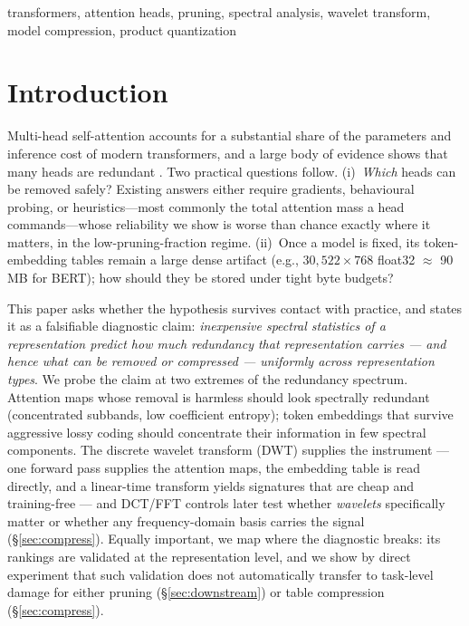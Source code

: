 \documentclass[conference]{IEEEtran}
\begin{document}
\begin{IEEEkeywords}
transformers, attention heads, pruning, spectral analysis, wavelet
transform, model compression, product quantization
\end{IEEEkeywords}

\section{Introduction}
Multi-head self-attention \cite{vaswani2017} accounts for a substantial
share of the parameters and inference cost of modern transformers, and a
large body of evidence shows that many heads are redundant
\cite{michel2019,voita2019,dalvi2020}. Two practical questions follow.
(i)~\emph{Which} heads can be removed safely? Existing answers either
require gradients, behavioural probing, or heuristics---most commonly
the total attention mass a head commands---whose reliability we show is
worse than chance exactly where it matters, in the low-pruning-fraction
regime. (ii)~Once a model is fixed, its token-embedding tables remain a
large dense artifact (e.g., $30{,}522\times768$ float32 $\approx$
90\,MB for BERT); how should they be stored under tight byte budgets?

This paper asks whether the hypothesis survives contact with practice,
and states it as a falsifiable diagnostic claim: \emph{inexpensive
spectral statistics of a representation predict how much redundancy that
representation carries --- and hence what can be removed or compressed
--- uniformly across representation types}. We probe the claim at two
extremes of the redundancy spectrum. Attention maps whose removal is
harmless should look spectrally redundant (concentrated subbands, low
coefficient entropy); token embeddings that survive aggressive lossy
coding should concentrate their information in few spectral components.
The discrete wavelet transform (DWT) \cite{mallat1989,daubechies1992}
supplies the instrument --- one forward pass supplies the attention
maps, the embedding table is read directly, and a linear-time transform
yields signatures that are cheap and training-free ---
and DCT/FFT controls later test whether \emph{wavelets} specifically
matter or whether any frequency-domain basis carries the signal
(\S\ref{sec:compress}). Equally important, we map where the diagnostic
breaks: its rankings are validated at the representation level, and we
show by direct experiment that such validation does not automatically
transfer to task-level damage for either pruning (\S\ref{sec:downstream})
or table compression (\S\ref{sec:compress}).
\end{document}

